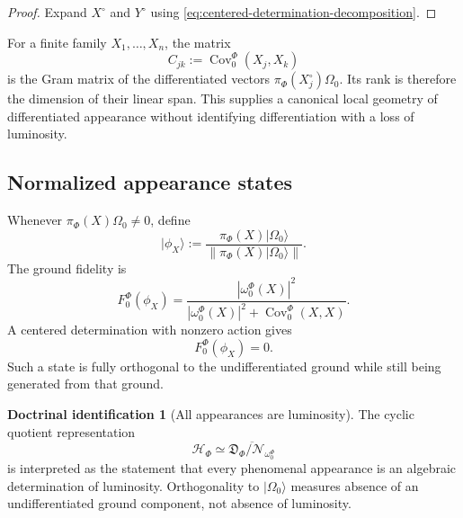 \documentclass[11pt,reqno]{scrartcl}
\newcommand{\scrHF}{\mathscr H_{\Phi}}
\newcommand{\piF}{\pi_{\Phi}}
\newcommand{\omegaF}{\omega_{0}^{\Phi}}
\newcommand{\ket}[1]{\lvert #1\rangle}
\newcommand{\detAlg}{\mathfrak D_{\Phi}}
\newcommand{\nullIdeal}{\mathcal N_{\omega_{0}^{\Phi}}}
\DeclareMathOperator{\Cov}{Cov}
\theoremstyle{plain}
\theoremstyle{definition}
\newtheorem{identification}[identification]{Doctrinal identification}
\theoremstyle{remark}
\begin{document}
\begin{proof}
Expand $X^{\circ}$ and $Y^{\circ}$ using
\eqref{eq:centered-determination-decomposition}.
\end{proof}

For a finite family $X_1,\dots,X_n$, the matrix
\begin{equation}
  C_{jk}:=\Cov_{0}^{\Phi}(X_j,X_k)
  \label{eq:appearance-Gram-matrix}
\end{equation}
is the Gram matrix of the differentiated vectors
$\piF(X_j^{\circ})\Omega_0$.  Its rank is therefore the dimension of their
linear span.  This supplies a canonical local geometry of differentiated
appearance without identifying differentiation with a loss of luminosity.

\subsection{Normalized appearance states}

Whenever $\piF(X)\Omega_0\neq0$, define
\begin{equation}
  \ket{\phi_X}
  :=\frac{\piF(X)\ket{\Omega_0}}
          {\|\piF(X)\ket{\Omega_0}\|}.
  \label{eq:normalized-appearance-state}
\end{equation}
The ground fidelity is
\begin{equation}
  F_0^{\Phi}(\phi_X)
  =\frac{|\omegaF(X)|^2}
         {|\omegaF(X)|^2+\Cov_0^{\Phi}(X,X)}.
  \label{eq:appearance-ground-fidelity-covariance}
\end{equation}
A centered determination with nonzero action gives
\begin{equation}
  F_0^{\Phi}(\phi_X)=0.
  \label{eq:centered-appearance-orthogonal}
\end{equation}
Such a state is fully orthogonal to the undifferentiated ground while still
being generated from that ground.

\begin{identification}[All appearances are luminosity]
\label{id:all-appearances-luminosity}
The cyclic quotient representation
\begin{equation}
  \scrHF\simeq\overline{\detAlg/\nullIdeal}
\end{equation}
is interpreted as the statement that every phenomenal appearance is an
algebraic determination of luminosity.  Orthogonality to
$\ket{\Omega_0}$ measures absence of an undifferentiated ground component,
not absence of luminosity.
\end{identification}
\end{document}
